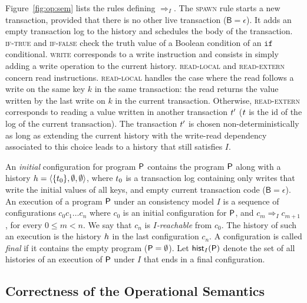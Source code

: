 Figure~\ref{fig:op:sem} lists the rules defining $\Rightarrow_I$. The \textsc{spawn} rule starts a new transaction, provided that there is no other live transaction ($\mathsf{B}=\epsilon$). It adds an empty transaction log to the history and schedules the body of the transaction. \textsc{if-true} and \textsc{if-false} check the truth value of a Boolean condition of an $\mathtt{if}$ conditional. \textsc{write} corresponds to a write instruction and consists in simply adding a write operation to the current history. \textsc{read-local} and \textsc{read-extern} concern read instructions. \textsc{read-local} handles the case where the read follows a write on the same key $k$ in the same transaction: the read returns the value written by the last write on $k$ in the current transaction. Otherwise, \textsc{read-extern} corresponds to reading a value written in another transaction $\tr'$ ($\tr$ is the id of the log of the current transaction). The transaction $\tr'$ is chosen non-deterministically as long as extending the current history with the write-read dependency associated to this choice leads to a history that still satisfies $I$.

An \emph{initial} configuration for program $\prog$ contains the program $\prog$ along with a history $\hist=\tup{\{\tr_0\},\emptyset,\emptyset}$, where $\tr_0$ is a transaction log containing only writes that write the initial values of all keys, and empty current transaction code ($\mathsf{B}=\epsilon$). 
An execution of a program $\prog$ under an consistency model $I$ is a sequence of configurations $c_0 c_1\ldots c_n$ where $c_0$ is an initial configuration for $\prog$, and $c_m\Rightarrow_I c_{m+1}$, for every $0\leq m < n$. We say that $c_n$ is \emph{$I$-reachable} from $c_0$.
The history of such an execution is the history $\hist$ in the last configuration $c_n$. 
A configuration is called \emph{final} if it contains the empty program ($\prog=\emptyset$).
Let $\histOf[I]{\prog}$ denote the set of all histories of an execution of $\prog$ under $I$ that ends in a final configuration.




%
%


\subsection{Correctness of the Operational Semantics}

